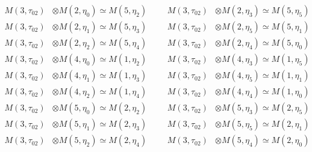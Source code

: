 \begin{align*}
M(3,\tau_{02}) &\otimes M(2,\eta_{0}) \simeq M(5,\eta_{2}) &&& M(3,\tau_{02}) &\otimes M(2,\eta_{3}) \simeq M(5,\eta_{5})\\
M(3,\tau_{02}) &\otimes M(2,\eta_{1}) \simeq M(5,\eta_{3}) &&& M(3,\tau_{02}) &\otimes M(2,\eta_{5}) \simeq M(5,\eta_{1})\\
M(3,\tau_{02}) &\otimes M(2,\eta_{2}) \simeq M(5,\eta_{4}) &&& M(3,\tau_{02}) &\otimes M(2,\eta_{4}) \simeq M(5,\eta_{0})\\
M(3,\tau_{02}) &\otimes M(4,\eta_{0}) \simeq M(1,\eta_{2}) &&& M(3,\tau_{02}) &\otimes M(4,\eta_{3}) \simeq M(1,\eta_{5})\\
M(3,\tau_{02}) &\otimes M(4,\eta_{1}) \simeq M(1,\eta_{3}) &&& M(3,\tau_{02}) &\otimes M(4,\eta_{5}) \simeq M(1,\eta_{1})\\
M(3,\tau_{02}) &\otimes M(4,\eta_{2}) \simeq M(1,\eta_{4}) &&& M(3,\tau_{02}) &\otimes M(4,\eta_{4}) \simeq M(1,\eta_{0})\\
M(3,\tau_{02}) &\otimes M(5,\eta_{0}) \simeq M(2,\eta_{2}) &&& M(3,\tau_{02}) &\otimes M(5,\eta_{3}) \simeq M(2,\eta_{5})\\
M(3,\tau_{02}) &\otimes M(5,\eta_{1}) \simeq M(2,\eta_{3}) &&& M(3,\tau_{02}) &\otimes M(5,\eta_{5}) \simeq M(2,\eta_{1})\\
M(3,\tau_{02}) &\otimes M(5,\eta_{2}) \simeq M(2,\eta_{4}) &&& M(3,\tau_{02}) &\otimes M(5,\eta_{4}) \simeq M(2,\eta_{0})\\
\end{align*}

